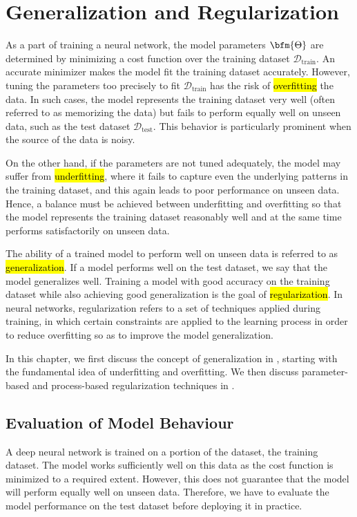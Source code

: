 \chapter{Generalization and Regularization}\label{generalization.regularization.ch}
\vspace{-0.2in}

As a part of training a neural network, the model parameters $\bfm{\Theta}$ are determined by minimizing a cost function over the training dataset $\mathcal{D}_{\text{train}}$. An accurate minimizer makes the model fit the training dataset accurately.  However, tuning the parameters too precisely to fit $\mathcal{D}_{\text{train}}$ has the risk of \hl{overfitting} the data. In such cases, the model represents the training dataset very well (often referred to as memorizing the data) but fails to perform equally well on unseen data, such as the test dataset $\mathcal{D}_{\text{test}}$. This behavior is particularly prominent when the source of the data is noisy.

On the other hand, if the parameters are not tuned adequately, the model may suffer from \hl{underfitting}, where it fails to capture even the underlying patterns in the training dataset, and this again leads to poor performance on unseen data.  Hence, a balance must be achieved between underfitting and overfitting so that the model represents the training dataset reasonably well and at the same time performs satisfactorily on unseen data.

The ability of a trained model to perform well on unseen data is referred to as \hl{generalization}. If a model performs well on the test dataset, we say that the model generalizes well. Training a model with good accuracy on the training dataset while also achieving good generalization is the goal of \hl{regularization}.  In neural networks, regularization refers to a set of techniques applied during training, in which certain constraints are applied to the learning process in order to reduce overfitting so as to improve the model generalization.

In this chapter, we first discuss the concept of generalization in , starting with the fundamental idea of underfitting and overfitting. We then discuss parameter-based and process-based regularization techniques in .
\section{Evaluation of Model Behaviour}\label{evaluation.model.behaviour.sec}
A deep neural network is trained on a portion of the dataset, the training dataset. The model works sufficiently well on this data as the cost function is minimized to a required extent. However, this does not guarantee that the model will perform equally well on unseen data.  Therefore, we have to evaluate the model performance on the test dataset before deploying it in practice. 


